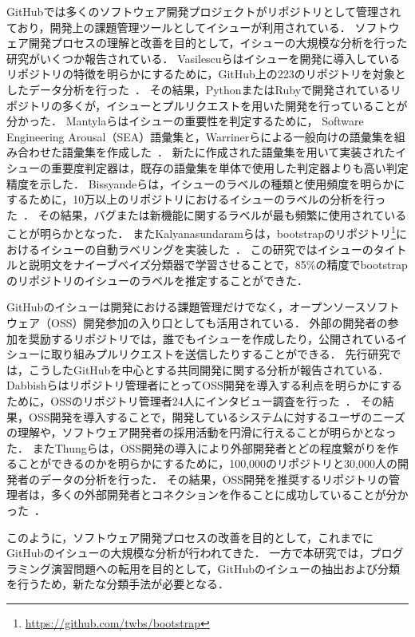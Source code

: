 GitHubでは多くのソフトウェア開発プロジェクトがリポジトリとして管理されており，開発上の課題管理ツールとしてイシューが利用されている．
ソフトウェア開発プロセスの理解と改善を目的として，イシューの大規模な分析を行った研究がいくつか報告されている．
Vasilescuらはイシューを開発に導入しているリポジトリの特徴を明らかにするために，GitHub上の223のリポジトリを対象としたデータ分析を行った~\cite{Continuous_Integration_in_a_Social_Coding_World}．
その結果，PythonまたはRubyで開発されているリポジトリの多くが，イシューとプルリクエストを用いた開発を行っていることが分かった．
Mantylaらはイシューの重要性を判定するために， Software Engineering Arousal（SEA）語彙集と，Warrinerらによる一般向けの語彙集を組み合わせた語彙集を作成した~\cite{Mantyla:issue:word:list}．
新たに作成された語彙集を用いて実装されたイシューの重要度判定器は，既存の語彙集を単体で使用した判定器よりも高い判定精度を示した．
Bissyandeらは，イシューのラベルの種類と使用頻度を明らかにするために，10万以上のリポジトリにおけるイシューのラベルの分析を行った~\cite{Bissyande:gh:issues}．
その結果，バグまたは新機能に関するラベルが最も頻繁に使用されていることが明らかとなった．
またKalyanasundaramらは，bootstrapのリポジトリ\footnote{\url{https://github.com/twbs/bootstrap}}におけるイシューの自動ラベリングを実装した~\cite{kalyanasundaram2014automatic}．
この研究ではイシューのタイトルと説明文をナイーブベイズ分類器で学習させることで，85\%の精度でbootstrapのリポジトリのイシューのラベルを推定することができた．

GitHubのイシューは開発における課題管理だけでなく，オープンソースソフトウェア（OSS）開発参加の入り口としても活用されている．
外部の開発者の参加を奨励するリポジトリでは，誰でもイシューを作成したり，公開されているイシューに取り組みプルリクエストを送信したりすることができる．
先行研究では，こうしたGitHubを中心とする共同開発に関する分析が報告されている．
Dabbishらはリポジトリ管理者にとってOSS開発を導入する利点を明らかにするために，OSSのリポジトリ管理者24人にインタビュー調査を行った~\cite{Social_Coding_in_GitHub}．
その結果，OSS開発を導入することで，開発しているシステムに対するユーザのニーズの理解や，ソフトウェア開発者の採用活動を円滑に行えることが明らかとなった．
またThungらは，OSS開発の導入により外部開発者とどの程度繋がりを作ることができるのかを明らかにするために，100,000のリポジトリと30,000人の開発者のデータの分析を行った．
その結果，OSS開発を推奨するリポジトリの管理者は，多くの外部開発者とコネクションを作ることに成功していることが分かった~\cite{Network_Structure_of_Social_Coding}．

このように，ソフトウェア開発プロセスの改善を目的として，これまでにGitHubのイシューの大規模な分析が行われてきた．
一方で本研究では，プログラミング演習問題への転用を目的として，GitHubのイシューの抽出および分類を行うため，新たな分類手法が必要となる．



